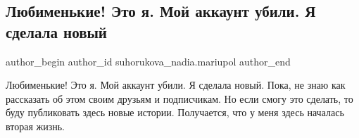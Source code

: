  
 
 
 
 

\subsection{Любименькие! Это я. Мой аккаунт убили. Я сделала новый}
\label{sec:04_02_2023.fb.suhorukova_nadia.mariupol.1.lyubimenkie__eto_ya_}

\ifcmt
 author_begin
   author_id suhorukova_nadia.mariupol
 author_end
\fi

Любименькие! Это я. Мой аккаунт убили. Я сделала новый. Пока, не знаю как
рассказать об этом своим друзьям и подписчикам. Но если смогу это сделать, то
буду публиковать здесь новые истории. Получается, что у меня здесь началась
вторая жизнь.

